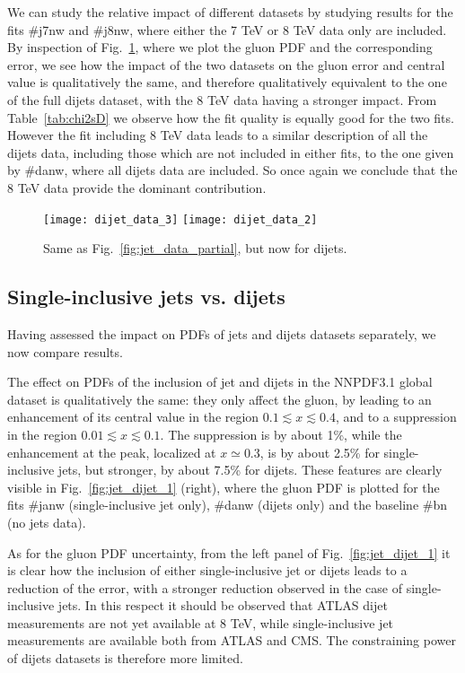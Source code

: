 %
We can study the relative impact of different datasets by studying results for the fits \#j7nw and \#j8nw, where 
either the 7 TeV or 8 TeV data only are included.
By inspection of Fig.~\ref{fig:dijet_data_partial}, where we plot the gluon PDF and the corresponding error,
we see how the impact of the two datasets 
on the gluon error and central value is qualitatively the same, and therefore qualitatively equivalent to the one of the 
full dijets dataset, with the 8 TeV data having a stronger impact.
From Table~\ref{tab:chi2sD} we observe how the fit quality is equally good for the two fits.
However the fit including 8 TeV data leads to a similar description of all the dijets data, including those which are
not included in either fits, to the one given by \#danw, where all dijets data are included.
So once again we conclude that the 8 TeV data provide the dominant contribution.
    \begin{figure}[!t]
    \centering
    \texttt{[image: dijet\_data\_3]}
    \texttt{[image: dijet\_data\_2]}
    \caption{Same as Fig.~\ref{fig:jet_data_partial}, but now for dijets.}
    \label{fig:dijet_data_partial}
\end{figure}

\subsection{Single-inclusive jets vs. dijets}
Having assessed the impact on PDFs of jets and dijets datasets separately, we now compare results.

%
The effect on PDFs of the inclusion of jet and dijets in the NNPDF3.1 global dataset is qualitatively the same:
they only affect the gluon, by leading to an enhancement of its central value in the region
$0.1\lesssim x \lesssim 0.4$, and to a  
suppression in the region $0.01\lesssim x \lesssim 0.1$. The suppression
is by about  1\%, while the enhancement at the peak, localized at  $x\simeq 0.3$, is  by about 2.5\%
for single-inclusive jets, but stronger, by about 7.5\% for dijets.
These features are clearly visible in Fig.~\ref{fig:jet_dijet_1} (right), where the gluon PDF is plotted
for the fits \#janw (single-inclusive jet only), \#danw (dijets only) and the baseline \#bn (no jets data).

%
As for the gluon PDF uncertainty, from the left panel of Fig.~\ref{fig:jet_dijet_1} it is clear how
the inclusion of either single-inclusive jet or dijets leads to a reduction of the error, with a stronger
reduction observed in the case of single-inclusive jets. In this respect it should be observed that
ATLAS dijet measurements are not yet available at 8 TeV, while single-inclusive jet measurements are available both from
ATLAS and CMS. The constraining power of dijets datasets is therefore more limited.


